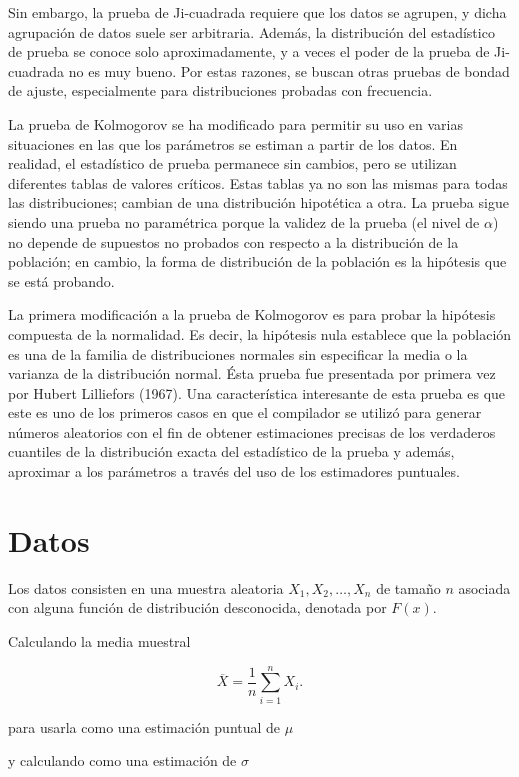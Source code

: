 \documentclass[
  a4paper,
  oneside,
  openany]{book}
\begin{document}
Sin embargo, la prueba de Ji-cuadrada requiere que los datos se agrupen, y dicha agrupación de datos suele ser arbitraria. Además, la distribución del estadístico de prueba se conoce solo aproximadamente, y a veces el poder de la prueba de Ji-cuadrada no es muy bueno. Por estas razones, se buscan otras pruebas de bondad de ajuste, especialmente para distribuciones probadas con frecuencia.

La prueba de Kolmogorov se ha modificado para permitir su uso en varias situaciones en las que los parámetros se estiman a partir de los datos. En realidad, el estadístico de prueba permanece sin cambios, pero se utilizan diferentes tablas de valores críticos. Estas tablas ya no son las mismas para todas las distribuciones; cambian de una distribución hipotética a otra. La prueba sigue siendo una prueba no paramétrica porque la validez de la prueba (el nivel de \(\alpha\)) no depende de supuestos no probados con respecto a la distribución de la población; en cambio, la forma de distribución de la población es la hipótesis que se está probando.

La primera modificación a la prueba de Kolmogorov es para probar la hipótesis compuesta de la normalidad. Es decir, la hipótesis nula establece que la población es una de la familia de distribuciones normales sin especificar la media o la varianza de la distribución normal. Ésta prueba fue presentada por primera vez por Hubert Lilliefors (1967). Una característica interesante de esta prueba es que este es uno de los primeros casos en que el compilador se utilizó para generar números aleatorios con el fin de obtener estimaciones precisas de los verdaderos cuantiles de la distribución exacta del estadístico de la prueba y además, aproximar a los parámetros a través del uso de los estimadores puntuales.

\hypertarget{datos-16}{%
\section{Datos}\label{datos-16}}

Los datos consisten en una muestra aleatoria \(X_{1},X_{2},\ldots,X_{n}\) de tamaño \(n\) asociada con alguna función de distribución desconocida, denotada por \(F(x)\).

Calculando la media muestral

\[\overline{X}=\frac{1}{n}\sum_{i=1}^{n}X_{i}.\]

para usarla como una estimación puntual de \(\mu\)

y calculando como una estimación de \(\sigma\)
\end{document}
